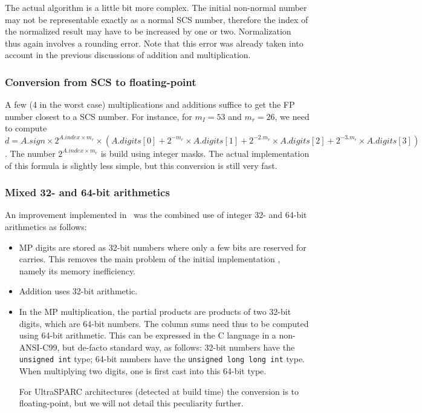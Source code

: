 The actual algorithm is a little bit more complex. The initial
non-normal number may not be representable exactly as a normal SCS
number, therefore the index of the normalized result may have to be
increased by one or two.  Normalization thus again involves a rounding
error. Note that this error was already taken into account in the previous
discussions of addition and multiplication.




\subsubsection{Conversion from SCS to floating-point}

A few (4 in the worst case) multiplications and additions suffice to
get the FP number closest to a SCS number.  For instance, for $m_I=53$
and $m_r=26$, we need to compute $d = A.sign \times 2^{A.index \times
  m_r} \times ( A.digits[0]+ 2^{-m_r} \times A.digits[1]+ 2^{-2.m_r}
\times A.digits[2]+ 2^{-3.m_r} \times A.digits[3])$. The number
$2^{A.index \times m_r}$ is build using integer masks. The actual
implementation of this formula is slightly less simple, but this
conversion is still very fast.


\subsubsection{Mixed 32- and 64-bit arithmetics}

An improvement implemented in \scslib\ was the combined use of integer 32- and 64-bit
arithmetics as follows: 

\begin{itemize}
\item MP digits are stored as 32-bit numbers where only a few bits are
  reserved for carries. This removes the main problem of the initial
implementation \cite{DefDin2002}, namely its memory inefficiency.

\item Addition uses 32-bit arithmetic. 

\item In the MP multiplication, the partial products are products of
  two 32-bit digits, which are 64-bit numbers. The column sums need
  thus to be computed using 64-bit arithmetic. This can be expressed
  in the C language in a non-ANSI-C99, but de-facto standard way, as
  follows: 32-bit numbers have the \texttt{unsigned int} type; 64-bit
  numbers have the \texttt{unsigned long long int} type. When
  multiplying two digits, one is first cast into this 64-bit type.
  
  For UltraSPARC architectures (detected at build time) the
  conversion is to floating-point, but we will not detail this
  peculiarity further.
\end{itemize}


